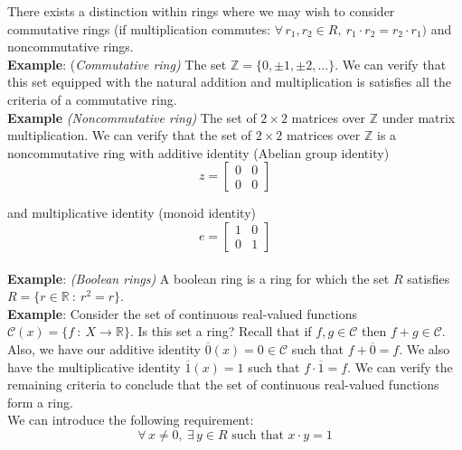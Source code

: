 \documentclass[12pt]{article}
\newlength\tindent
\renewcommand{\indent}{\hspace*{\tindent}}
\newcommand{\R}{\mathbb R}
\newcommand{\Z}{\mathbb Z}
\begin{document}
\indent There exists a distinction within rings where we may wish to consider commutative rings (if multiplication commutes: $\forall\,r_1, r_2 \in R, ~r_1 \cdot r_2 = r_2 \cdot r_1)$ and noncommutative rings. \\

{\bf Example}: {(\em Commutative ring)} The set $\Z = \{0, \pm 1, \pm 2, ...\}$. We can verify that this set equipped with the natural addition and multiplication is satisfies all the criteria of a commutative ring. \\

{\bf Example} {\em (Noncommutative ring)} The set of $2\times 2$ matrices over $\Z$ under matrix multiplication. We can verify that the set of $2\times 2$ matrices over $\Z$ is a noncommutative ring with additive identity (Abelian group identity)
\begin{equation*}
	z = 
	\begin{bmatrix}
		0 & 0 \\
		0 & 0
	\end{bmatrix}
\end{equation*}

and multiplicative identity (monoid identity)
\begin{equation*}
	e = 
	\begin{bmatrix}
		1 & 0 \\
		0 & 1
	\end{bmatrix}
\end{equation*} \hfill\\

{\bf Example}: {\em (Boolean rings)} A boolean ring is a ring for which the set $R$ satisfies $R = \{r \in \R ~:~ r^2 = r \}$. \\

{\bf Example}: Consider the set of continuous real-valued functions $\mathcal C(x) = \{ f ~:~ X \to \R \}$. Is this set a ring? Recall that if $f, g \in \mathcal C$ then $f + g \in \mathcal C$. Also, we have our additive identity $\overline{0}(x) = 0 \in \mathcal C$ such that $f + \overline{0} = f$. We also have the multiplicative identity $\overline{1}(x) = 1$ such that $f \cdot \overline{1} = f$. We can verify the remaining criteria to conclude that the set of continuous real-valued functions form a ring. \\

We can introduce the following requirement:
\begin{equation*}
	\forall\, x \neq 0,~ \exists\, y \in R \text{ such that } x\cdot y = 1
\end{equation*}
\end{document}
